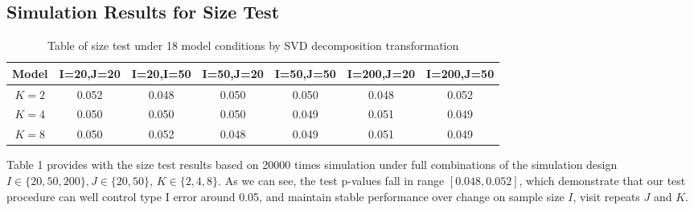 \subsection{Simulation Results for Size Test}

\begin{table}[!h]
\caption{Table of size test under 18 model conditions by SVD decomposition transformation}
\centering
\begin{tabular}{c c c c c c c}
\toprule
{Model} & I=20,J=20 & I=20,I=50 & I=50,J=20 & I=50,J=50 &I=200,J=20 & I=200,J=50\\
\midrule
$K=2$ & 0.052 & 0.048 & 0.050 & 0.050 & 0.048 & 0.052 \\ 

$K=4$ & 0.050 & 0.050 & 0.050 & 0.049 & 0.051 & 0.049 \\ 

$K=8$ & 0.050 & 0.052 & 0.048 & 0.049 & 0.051 & 0.049\\ 

\bottomrule
\end{tabular}
\label{tab:sim_results for size test}
\end{table}
 Table 1 provides with the size test results based on 20000 times simulation under full combinations of the simulation design $I \in \{20,50,200\}, J \in \{20,50\}$, $K \in \{2,4,8\}$. As we can see, the test p-values fall in range $[0.048, 0.052]$, which demonstrate that our test procedure can well control type I error around 0.05, and maintain stable performance over change on sample size $I$, visit repeats $J$ and $K$.  
 
\newpage
